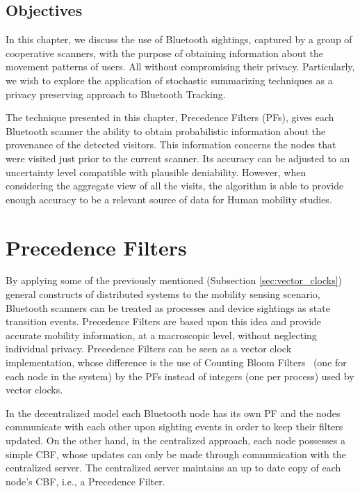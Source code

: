 \subsection{Objectives}
\label{sec:ct-objectives}
In this chapter, we discuss the use of Bluetooth sightings, captured
by a group of cooperative scanners, with the purpose of obtaining
information about the movement patterns of users. All without
compromising their privacy. Particularly, we wish to explore the
application of stochastic summarizing techniques as a privacy preserving
approach to Bluetooth Tracking.

The technique presented in this chapter, Precedence Filters (PFs), gives
each Bluetooth scanner the ability to obtain probabilistic information
about the provenance of the detected visitors. This information
concerns the nodes that were visited just prior to the current
scanner. Its accuracy can be adjusted to an uncertainty level
compatible with plausible deniability. 
However, when considering the aggregate view of all the visits, the
algorithm is able to provide enough accuracy to be a relevant source
of data for Human mobility studies.

\section{Precedence Filters}
\label{sec:precedence-filters}
By applying some of the previously mentioned (Subsection
\ref{sec:vector_clocks}) general constructs of distributed systems to
the mobility sensing scenario, Bluetooth scanners can be treated as
processes and device sightings as state transition events. Precedence
Filters are based upon this idea and provide accurate mobility
information, at a macroscopic level, without neglecting individual
privacy.  Precedence Filters can be seen as a vector clock
\cite{Fidge,Mattern} implementation, whose difference is the use of
Counting Bloom Filters~\cite{Fan98summarycache:,Mitzenmacher:2002:CBF:581876.581878} (one for each node in the system) by the PFs
instead of integers (one per process) used by vector clocks.

In the decentralized model each Bluetooth node has its own PF and the
nodes communicate with each other upon sighting events in order to
keep their filters updated. On the other hand, in the centralized
approach, each node possesses a simple CBF, whose updates can only be
made through communication with the centralized server.  The
centralized server maintains an up to date copy of each node's CBF,
i.e., a Precedence Filter.

